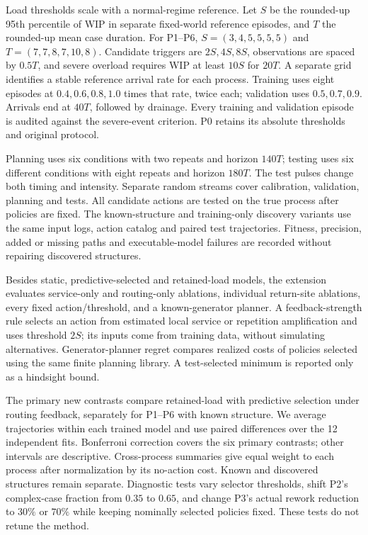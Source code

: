 Load thresholds scale with a normal-regime reference. Let $S$ be the rounded-up 95th percentile of WIP in separate fixed-world reference episodes, and $T$ the rounded-up mean case duration. For P1--P6, $S=(3,4,5,5,5,5)$ and $T=(7,7,8,7,10,8)$. Candidate triggers are $2S,4S,8S$, observations are spaced by $0.5T$, and severe overload requires WIP at least $10S$ for $20T$. A separate grid identifies a stable reference arrival rate for each process. Training uses eight episodes at $0.4,0.6,0.8,1.0$ times that rate, twice each; validation uses $0.5,0.7,0.9$. Arrivals end at $40T$, followed by drainage. Every training and validation episode is audited against the severe-event criterion. P0 retains its absolute thresholds and original protocol.

Planning uses six conditions with two repeats and horizon $140T$; testing uses six different conditions with eight repeats and horizon $180T$. The test pulses change both timing and intensity. Separate random streams cover calibration, validation, planning and tests. All candidate actions are tested on the true process after policies are fixed. The known-structure and training-only discovery variants use the same input logs, action catalog and paired test trajectories. Fitness, precision, added or missing paths and executable-model failures are recorded without repairing discovered structures.

Besides static, predictive-selected and retained-load models, the extension evaluates service-only and routing-only ablations, individual return-site ablations, every fixed action/threshold, and a known-generator planner. A feedback-strength rule selects an action from estimated local service or repetition amplification and uses threshold $2S$; its inputs come from training data, without simulating alternatives. Generator-planner regret compares realized costs of policies selected using the same finite planning library. A test-selected minimum is reported only as a hindsight bound.

The primary new contrasts compare retained-load with predictive selection under routing feedback, separately for P1--P6 with known structure. We average trajectories within each trained model and use paired differences over the 12 independent fits. Bonferroni correction covers the six primary contrasts; other intervals are descriptive. Cross-process summaries give equal weight to each process after normalization by its no-action cost. Known and discovered structures remain separate. Diagnostic tests vary selector thresholds, shift P2's complex-case fraction from $0.35$ to $0.65$, and change P3's actual rework reduction to $30\%$ or $70\%$ while keeping nominally selected policies fixed. These tests do not retune the method.
